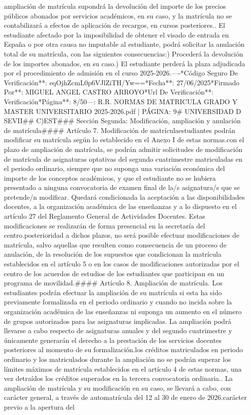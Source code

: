 \documentclass{article}
\begin{document}
\begin{itemize}
ampliación de matrícula supondrá la devolución del importe de los precios públicos abonados por servicios académicos, en su caso, y la matrícula no se contabilizará a efectos de aplicación de recargos, en cursos posteriores.\n{}. El estudiante afectado por la imposibilidad de obtener el visado de entrada en España o por otra causa no imputable al estudiante, podrá solicitar la anulación total de su matrícula, con las siguientes consecuencias:\n\na) Procederá la devolución de los importes abonados, en su caso.\n\nb) El estudiante perderá la plaza adjudicada por el procedimiento de admisión en el curso 2025-2026.\n\n----\n\n**Código Seguro De Verificación**: eqOjhZcmL0p6VJlZiTH/Yw==\n**Fecha**: 27/06/2025\n**Firmado Por**: MIGUEL ANGEL CASTRO ARROYO\n**Url De Verificación**: Verificación\n**Página**: 8/50\n\n---\n\nFUENTE: R.R. NORMAS DE MATRICULA GRADO Y MASTER UNIVERSITARIO 2025-2026.pdf | PÁGINA: 9\n# UNIVERSIDAD D SEVII\n\n## C)EST\n\n### Sección Segunda: Modificación, ampliación y anulación de matrícula\n\n#### Artículo 7. Modificación de matrícula\n\nLos estudiantes podrán modificar su matrícula según lo establecido en el Anexo I de estas normas.\n\nCoincidiendo con el plazo de ampliación de matrícula, se podrán admitir solicitudes de modificación de matrícula de asignaturas optativas del segundo cuatrimestre matriculadas en el periodo ordinario, siempre que no suponga una variación económica del importe de los conceptos académicos, y que el estudiante no se hubiera presentado a ninguna convocatoria de examen final de la/s asignatura/s que se pretende/n modificar. Quedará condicionada la aceptación a las disponibilidades docentes, a la organización académica de las enseñanzas y a lo dispuesto en el artículo 27 del Reglamento General de Actividades Docentes. Estas modificaciones se realizarán de forma presencial en la secretaría del centro.\n\nCon posterioridad a dichos plazos, no será posible efectuar modificaciones de matrícula, salvo aquellas que resulten como consecuencia de un proceso de anulación, de la resolución de los supuestos que condicionan la matrícula establecidos en el artículo 5 o en los casos de modificaciones autorizadas por el centro de los acuerdos de estudios de los estudiantes que participan en un programa de movilidad.\n\n#### Artículo 8. Ampliación de matrícula\n{}. Los estudiantes podrán efectuar la ampliación de su matrícula si esta ha sido previamente formalizada en el periodo ordinario y cuando no incida sobre la organización académica de las enseñanzas ni suponga un aumento en el número de grupos autorizados para las asignaturas implicadas. La ampliación podrá llevarse a cabo respecto de asignaturas anuales y del segundo cuatrimestre y únicamente generarán el derecho a la prestación de los servicios docentes posteriores al momento de su formalización.\n\nEntre los créditos matriculados en periodo ordinario y los matriculados durante la ampliación no se podrán superar los límites máximos de matrícula establecidos en el artículo 4 de estas normas, una vez detraídos los créditos superados en la tercera convocatoria ordinaria.\n{}. La ampliación de matrícula y su modificación en su caso, se llevará a cabo, con carácter general, a través de automatrícula del 12 al 30 de enero de 2026.\n\nCon carácter previo a la apertura del 
\end{itemize}
\end{document}
